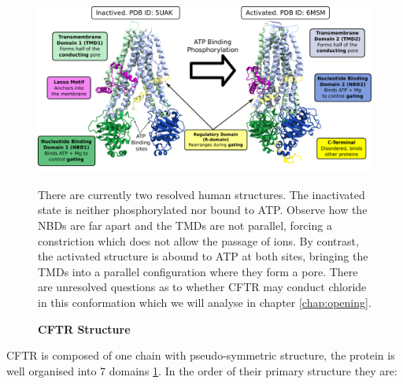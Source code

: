 \begin{figure}
	\begin{center}
	\includegraphics[width=\textwidth]{figures/CFTR_structure.pdf}
	\end{center}
	\label{CFTR_structure_domains}
	\captionsetup{singlelinecheck = false, justification=raggedright}
	\caption[CFTR Structure] {\textbf{CFTR Structure}}{There are currently two resolved human structures. The inactivated state is neither phosphorylated nor bound to ATP. Observe how the NBDs are far apart and the TMDs are not parallel, forcing a constriction which does not allow the passage of ions. By contrast, the activated structure is abound to ATP at both sites, bringing the TMDs into a parallel configuration where they form a pore. There are unresolved questions as to whether CFTR may conduct chloride in this conformation which we will analyse in chapter \ref{chap:opening}.} 

\end{figure}
CFTR is composed of one chain with pseudo-symmetric structure, the protein is well organised into 7 domains \ref{CFTR_structure_domains}. In the order of their primary structure they are: 
